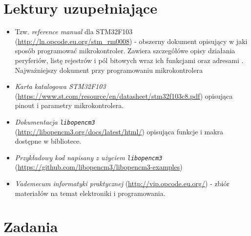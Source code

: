 \documentclass{pdfBooklets}
\begin{document}
\section{Lektury uzupełniające}
\begin{itemize}

\item Tzw. \emph{reference manual} dla STM32F103 (\url{http://ln.opcode.eu.org/stm_rm0008}) - obszerny dokument opisujący w jaki sposób programować
  mikrokontroler. Zawiera szczegółówe opisy działania peryferiów, listę rejestrów i pól bitowych wraz ich funkcjami oraz
  adresami \footnotemark. Najważniejszy dokument przy programowaniu mikrokontrolera
  

\item \emph{Karta katalogowa STM32F103}\\ (\url{https://www.st.com/resource/en/datasheet/stm32f103c8.pdf}) opisująca pinout i
  parametry mikrokontrolera.

\item \emph{Dokumentacja \Verb$libopencm3$}\\ (\url{http://libopencm3.org/docs/latest/html/}) opisująca funkcje i makra dostępne
  w bibliotece.
  
\item \emph{Przykładowy kod napisany z użyciem \Verb$libopencm3$} (\url{https://github.com/libopencm3/libopencm3-examples}) 
  
\item \emph{Vademecum informatyki praktycznej} (\url{http://vip.opcode.eu.org/}) - zbiór materiałów na temat elektroniki i programowania.

\end{itemize}

\section{Zadania}
\end{document}
